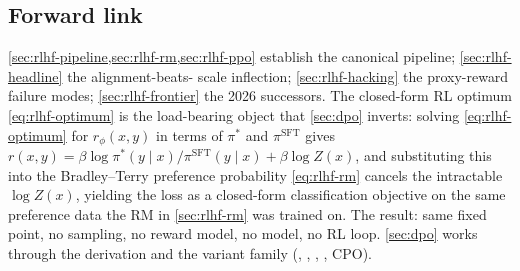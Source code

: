 \subsection{Forward link}
\label{sec:rlhf-forward}

\cref{sec:rlhf-pipeline,sec:rlhf-rm,sec:rlhf-ppo} establish the
canonical  pipeline; \cref{sec:rlhf-headline} the alignment-beats-
scale inflection; \cref{sec:rlhf-hacking} the proxy-reward failure
modes; \cref{sec:rlhf-frontier} the 2026 successors. The closed-form
RL optimum \cref{eq:rlhf-optimum} is the load-bearing object that
\cref{sec:dpo} inverts: solving \cref{eq:rlhf-optimum} for
$r_\phi(x, y)$ in terms of $\pi^*$ and $\pi^{\mathrm{SFT}}$ gives
$r(x, y) = \beta \log \pi^*(y \mid x) / \pi^{\mathrm{SFT}}(y \mid x) +
\beta \log Z(x)$, and substituting this into the Bradley--Terry
preference probability \cref{eq:rlhf-rm} cancels the intractable
$\log Z(x)$, yielding the  loss as a closed-form classification
objective on the same preference data the RM in \cref{sec:rlhf-rm}
was trained on. The result: same fixed point, no sampling, no reward
model, no  model, no RL loop. \cref{sec:dpo} works through the
derivation and the variant family (, , , , CPO).
